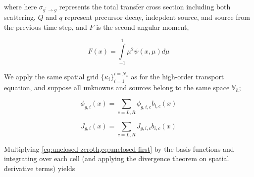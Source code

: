 \documentclass{proposal}
\newcommand{\p}{\ensuremath{^\prime}}
\newcommand{\rarr}{\ensuremath{\rightarrow}}
\begin{document}
\begin{appendices}
where here $\sigma_{g\p \rarr g}$ represents the total transfer cross section including both scattering, $Q$ and $q$ represent precursor decay, indepdent source, and source from the previous time step, and  $F$ is the second angular moment,

\begin{equation}
    F(x) = \int\limits_{-1}^1 \mu^2 \psi(x, \mu)d\mu
\end{equation}

We apply the same spatial grid $\{\kappa_i\}_{i=1}^{i=N_x}$ as for the high-order transport equation, and suppose all unknowns and sources belong to the same space $\mathbb{V}_h$;

\begin{equation}
    \phi_{g,i}(x) = \sum_{c=L,R}\phi_{g, i, c}b_{i,c}(x)
\end{equation}

\begin{equation}
    J_{g,i}(x) = \sum_{c=L,R}J_{g, i, c}b_{i,c}(x)
\end{equation}

Multiplying \cref{eq:unclosed-zeroth,eq:unclosed-first} by the basis functions and integrating over each cell (and applying the divergence theorem on spatial derivative terms) yields



\end{appendices}
\end{document}

